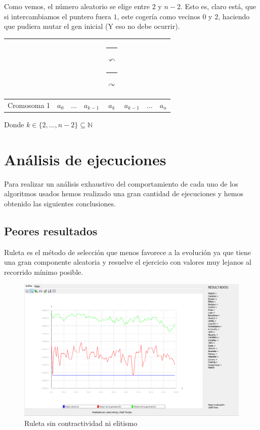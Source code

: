 \documentclass{article}
\def\MCr{
	\multicolumn{1}{c}{
		\rule{-5pt}{0ex}$\stackrel{}{\curvearrowleft}$
		\rule{+20pt}{0ex}$\stackrel{}{\curvearrowright}$
	}
}
\def\MCe{\multicolumn{1}{c}{}}
\begin{document}
Como vemos, el número aleatorio se elige entre $2$ y $n-2$. Esto es, claro está, que si intercambiamos el puntero fuera $1$, este cogería como vecinos $0$ y $2$, haciendo que pudiera mutar el gen inicial (Y eso no debe ocurrir).


\begin{tabular}{|l|*7{c|}}
	\MCe & \MCe & \MCe & \MCe & \MCr & \MCe & \MCe \\\hline
	Cromosoma 1 & $a_0$ & $\dots$ & $a_{k-1}$ & $a_{k}$ & $a_{k-1}$ & $\dots$ & $a_{n}$ \\\hline
\end{tabular}
\newline\newline
Donde $k\in \{2, \dots, n-2\}\subseteq\mathbb{N}$


\newpage
\section{Análisis de ejecuciones}
Para realizar un análisis exhaustivo del comportamiento de cada uno de los algoritmos usados hemos realizado una gran cantidad de ejecuciones y hemos obtenido las siguientes conclusiones.
\subsection{Peores resultados}

Ruleta es el método de selección que menos favorece a la evolución ya que tiene una gran componente aleatoria y resuelve el ejercicio con valores muy lejanos al recorrido mínimo posible.
\\
\begin{figure}[h]
	\centering
	\includegraphics[scale=0.4]{./images/rule1.png}
	\caption{Ruleta sin contractividad ni elitismo}
\end{figure}
\end{document}
